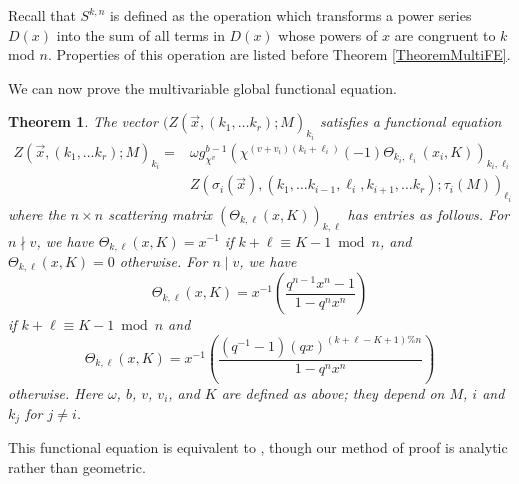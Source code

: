 \documentclass[11pt,letterpaper]{article}
\newtheorem{theorem}{Theorem}[section]
\theoremstyle{definition}
\theoremstyle{remark}
\numberwithin{equation}{section}
\theoremstyle{dotless}
\begin{document}
Recall that $S^{k,n}$ is defined as the operation which transforms a power series $D(x)$ into the sum of all terms in $D(x)$ whose powers of $x$ are congruent to $k$ mod $n$. Properties of this operation are listed before Theorem \ref{TheoremMultiFE}.

We can now prove the multivariable global functional equation.
\begin{theorem}\label{dirichlet-multivariable-global}
The vector $(Z(\vec{x}, (k_1, \ldots k_r); M)_{k_i}$ satisfies a functional equation
\begin{equation}
\begin{split}
Z(\vec{x}, (k_1, \ldots k_r); M)_{k_i} = &\omega g_{\chi^v}^{b-1}\left(\chi^{(v+v_i)(k_i+\ell_i)}(-1)\Theta_{k_i, \ell_i}(x_i, K) \right)_{k_i, \ell_i} \\
&Z(\sigma_i(\vec{x}), (k_1, \ldots k_{i-1}, \ell_i, k_{i+1}, \ldots k_r); \tau_i(M))_{\ell_i}
\end{split}
\end{equation}
where the $n\times n$ scattering matrix $(\Theta_{k, \ell}(x, K))_{k, \ell}$ has entries as follows. For $n \nmid v$, we have $\Theta_{k, \ell}(x, K)= x^{-1}$ if $k+\ell \equiv K-1 \bmod n$, and $\Theta_{k, \ell}(x, K)=0$ otherwise. 
For $n\mid v$, we have 
\begin{equation*}
\Theta_{k,\ell}(x, K)= x^{-1} \left(\frac{q^{n-1}x^n-1}{1-q^nx^n}\right)
\end{equation*}
if $k+\ell \equiv K-1 \bmod n$ and  
\begin{equation*}
\Theta_{k,\ell}(x, K)= x^{-1} \left(\frac{(q^{-1}-1)(qx)^{\left(k+\ell-K+1\right) \%n}}{1-q^nx^n}\right)
\end{equation*}
otherwise. Here $\omega$, $b$, $v$, $v_i$, and $K$ are defined as above; they depend on $M$, $i$ and $k_j$ for $j \neq i$. 
\end{theorem}
This functional equation is equivalent to \cite[Theorem 6]{HaseLiu24}, though our method of proof is analytic rather than geometric.
\end{document}
